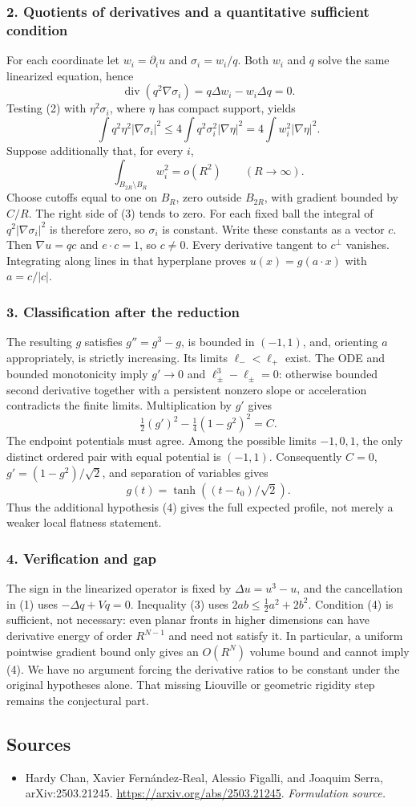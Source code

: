 \documentclass[11pt]{article}
\begin{document}
\subsubsection{2. Quotients of derivatives and a quantitative sufficient condition}
For each coordinate let $w_i=\partial_i u$ and $\sigma_i=w_i/q$. Both $w_i$ and $q$ solve the same linearized equation, hence
\[\operatorname{div}(q^2\nabla\sigma_i)=q\Delta w_i-w_i\Delta q=0.\tag{2}\]
Testing (2) with $\eta^2\sigma_i$, where $\eta$ has compact support, yields
\[\int q^2\eta^2|\nabla\sigma_i|^2
\le4\int q^2\sigma_i^2|\nabla\eta|^2=4\int w_i^2|\nabla\eta|^2.\tag{3}\]
Suppose additionally that, for every $i$,
\[\int_{B_{2R}\setminus B_R}w_i^2=o(R^2)\qquad(R\to\infty).\tag{4}\]
Choose cutoffs equal to one on $B_R$, zero outside $B_{2R}$, with gradient bounded by $C/R$. The right side of (3) tends to zero. For each fixed ball the integral of $q^2|\nabla\sigma_i|^2$ is therefore zero, so $\sigma_i$ is constant. Write these constants as a vector $c$. Then $\nabla u=qc$ and $e\cdot c=1$, so $c\ne0$. Every derivative tangent to $c^\perp$ vanishes. Integrating along lines in that hyperplane proves $u(x)=g(a\cdot x)$ with $a=c/|c|$.

\subsubsection{3. Classification after the reduction}
The resulting $g$ satisfies $g''=g^3-g$, is bounded in $(-1,1)$, and, orienting $a$ appropriately, is strictly increasing. Its limits $\ell_-<\ell_+$ exist. The ODE and bounded monotonicity imply $g'\to0$ and $\ell_\pm^3-\ell_\pm=0$: otherwise bounded second derivative together with a persistent nonzero slope or acceleration contradicts the finite limits. Multiplication by $g'$ gives
\[\tfrac12(g')^2-\tfrac14(1-g^2)^2=C.\]
The endpoint potentials must agree. Among the possible limits $-1,0,1$, the only distinct ordered pair with equal potential is $(-1,1)$. Consequently $C=0$, $g'=(1-g^2)/\sqrt2$, and separation of variables gives
\[g(t)=\tanh((t-t_0)/\sqrt2).\]
Thus the additional hypothesis (4) gives the full expected profile, not merely a weaker local flatness statement.

\subsubsection{4. Verification and gap}
The sign in the linearized operator is fixed by $\Delta u=u^3-u$, and the cancellation in (1) uses $-\Delta q+Vq=0$. Inequality (3) uses $2ab\le\tfrac12a^2+2b^2$. Condition (4) is sufficient, not necessary: even planar fronts in higher dimensions can have derivative energy of order $R^{N-1}$ and need not satisfy it. In particular, a uniform pointwise gradient bound only gives an $O(R^N)$ volume bound and cannot imply (4). We have no argument forcing the derivative ratios to be constant under the original hypotheses alone. That missing Liouville or geometric rigidity step remains the conjectural part.

\subsection{Sources}
\begin{itemize}
\item[S1]Hardy Chan, Xavier Fernández-Real, Alessio Figalli, and Joaquim Serra, arXiv:2503.21245.
\url{https://arxiv.org/abs/2503.21245}.
\textit{Formulation source.}
\end{itemize}
\end{document}
